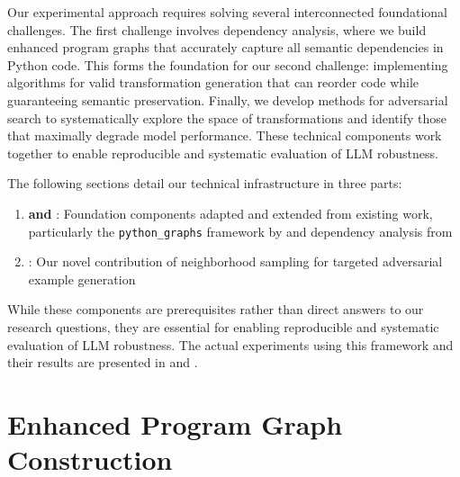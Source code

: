 \documentclass[%
thesis=student,%
coverpage=false,%
titlepage=false,%
headmarks=true, %
english,%
font=libertine, %
math=newpxtx, %
BCOR=5mm,%
coverBCOR=11mm%
]{tum-templates/book/tumbook}
\begin{document}
Our experimental approach requires solving several interconnected foundational challenges. The first challenge involves dependency analysis, where we build enhanced program graphs that accurately capture all semantic dependencies in Python code. This forms the foundation for our second challenge: implementing algorithms for valid transformation generation that can reorder code while guaranteeing semantic preservation. Finally, we develop methods for adversarial search to systematically explore the space of transformations and identify those that maximally degrade model performance. These technical components work together to enable reproducible and systematic evaluation of LLM robustness.

The following sections detail our technical infrastructure in three parts:
\begin{enumerate}
    \item \textbf{ and }: Foundation components adapted and extended from existing work, particularly the \texttt{python\_graphs} framework by \textcite{Bieber2022} and dependency analysis from \textcite{Geisler2023}
    \item \textbf{}: Our novel contribution of neighborhood sampling for targeted adversarial example generation
\end{enumerate}

While these components are prerequisites rather than direct answers to our research questions, they are essential for enabling reproducible and systematic evaluation of LLM robustness. The actual experiments using this framework and their results are presented in  and .

\section{Enhanced Program Graph Construction}
\label{sec:AST_manipulations}
\end{document}
